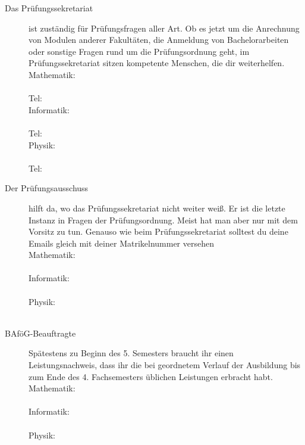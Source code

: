 \begin{description}
    \item[Das Prüfungssekretariat] ist zuständig für Prüfungsfragen aller Art. Ob es jetzt um die Anrechnung von Modulen anderer Fakultäten, die Anmeldung von Bachelorarbeiten oder sonstige Fragen rund um die Prüfungsordnung geht, im Prüfungssekretariat sitzen kompetente Menschen, die dir weiterhelfen. \\
    Mathematik: \pruefsekmathe \\
    \email{\pruefsekmatheemail}\\
    Tel: \pruefsekmathetel\\
    Informatik: \pruefsekinfo \\ \email{\pruefsekinfoemail}\\
    Tel: \pruefsekinfotel \\
    Physik: \pruefsekphysik \\
    \email{\pruefsekphysikemail}\\
    Tel: \pruefsekphysiktel \\

    \item[Der Prüfungsausschuss] hilft da, wo das Prüfungssekretariat nicht weiter weiß. Er ist die letzte Instanz in Fragen der Prüfungsordnung. Meist hat man aber nur mit dem Vorsitz zu tun. Genauso wie beim Prüfungssekretariat solltest du deine Emails gleich mit deiner Matrikelnummer versehen\\
    Mathematik: \pruefausschussvorsitzmathe\\
    \email{\pruefausschussvorsitzmatheemail} \\
    Informatik: \pruefausschussvorsitzinformatik\\
    \email{\pruefausschussvorsitzinformatikemail} \\
    Physik: \pruefausschussvorsitzphysik\\
    \email{\pruefausschussvorsitzphysikemail} \\

    \item[BAföG-Beauftragte] Spätestens zu Beginn des 5. Semesters braucht ihr einen Leistungsnachweis, dass ihr die bei geordnetem Verlauf der Ausbildung bis zum Ende des 4. Fachsemesters üblichen Leistungen erbracht habt.\\
    Mathematik: \bafogmathe\\
    \email{\bafogmatheemail} \\
    Informatik: \bafoginformatik\\
    \email{\bafoginformatikemail}\\
    Physik: \bafogphysik\\
    \email{\bafogphysikemail}


\end{description}
